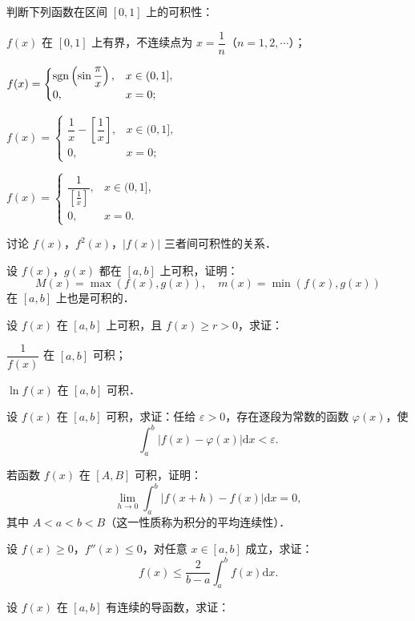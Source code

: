 \begin{xiti}
\item 判断下列函数在区间 $[0, 1]$ 上的可积性：
\begin{ziti}
\item $f(x)$ 在 $[0, 1]$ 上有界，不连续点为 $x = \dfrac{1}{n}$（$n = 1, 2, \cdots$）；
\item $f(x) = \begin{cases} \operatorname{sgn}\left( \sin \dfrac{\pi}{x} \right), & x \in (0, 1], \\ 0, & x = 0; \end{cases}$
\item $f(x) = \begin{cases} \dfrac{1}{x} - \left[ \dfrac{1}{x} \right], & x \in (0, 1], \\ 0, & x = 0; \end{cases}$
\item $f(x) = \begin{cases} \dfrac{1}{\left[ \frac{1}{x} \right]}, & x \in (0, 1], \\ 0, & x = 0. \end{cases}$
\end{ziti}
\item 讨论 $f(x)$，$f^2(x)$，$|f(x)|$ 三者间可积性的关系．
\item 设 $f(x)$，$g(x)$ 都在 $[a, b]$ 上可积，证明：
\[
M(x) = \max \left( f(x), g(x) \right), \quad m(x) = \min \left( f(x), g(x) \right)
\]
在 $[a, b]$ 上也是可积的．
\item 设 $f(x)$ 在 $[a, b]$ 上可积，且 $f(x) \geqslant r > 0$，求证：
\begin{ziti}
\item $\dfrac{1}{f(x)}$ 在 $[a, b]$ 可积；
\item $\ln f(x)$ 在 $[a, b]$ 可积．
\end{ziti}
\item 设 $f(x)$ 在 $[a, b]$ 可积，求证：任给 $\varepsilon > 0$，存在逐段为常数的函数 $\varphi(x)$，使
\[
\int_{a}^{b} \left| f(x) - \varphi(x) \right| \mathrm{d}x < \varepsilon.
\]
\item 若函数 $f(x)$ 在 $[A, B]$ 可积，证明：
\[
\lim_{h \to 0} \int_{a}^{b} \left| f(x + h) - f(x) \right| \mathrm{d}x = 0,
\]
其中 $A < a < b < B$（这一性质称为积分的平均连续性）．
\item 设 $f(x) \geqslant 0$，$f''(x) \leqslant 0$，对任意 $x \in [a, b]$ 成立，求证：
\[
f(x) \leqslant \frac{2}{b - a} \int_{a}^{b} f(x) \mathrm{d}x.
\]
\item 设 $f(x)$ 在 $[a, b]$ 有连续的导函数，求证：
\[
\]
\end{xiti}

